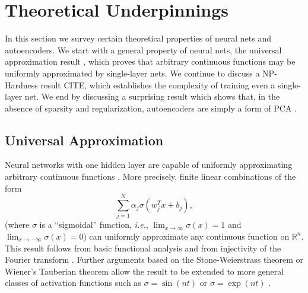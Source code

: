 \documentclass[twocolumn]{article}
\newcommand{\R}{\mathbb{R}}
\begin{document}


\section{Theoretical Underpinnings}
In this section we survey certain theoretical properties of neural nets and
autoencoders. We start with a general property of neural nets, the universal
approximation result \cite{cybenko1989approximation}, which proves that
arbitrary continuous functions may be uniformly approximated by single-layer
nets. We continue to discuss a NP-Hardness result CITE, which establishes the
complexity of training even a single-layer net. We end by discussing a
surprising result which shows that, in the absence of sparsity and
regularization, autoencoders are simply a form of PCA \cite{bourlard1988auto}.

\subsection{Universal Approximation}
Neural networks with one hidden layer are capable of uniformly approximating
arbitrary continuous functions \cite{cybenko1989approximation}. More precisely,
finite linear combinations of the form
\[\sum_{j=1}^N \alpha_j \sigma(w_j^T x + b_j), \]
(where $\sigma$ is a ``sigmoidal'' function, \textit{i.e.}, $\lim_{x \to \infty}
\sigma(x) = 1$ and $\lim_{x \to -\infty} \sigma(x) = 0$) can uniformly
approximate any continuous function on $\R^n$.  This result follows from basic
functional analysis and from injectivity of the Fourier transform
\cite{rudin1991functional}. Further arguments based on the Stone-Weierstrass
theorem or Wiener's Tauberian theorem allow the result to be extended to more
general classes of activation functions such as $\sigma = \sin(nt)$ or $\sigma =
\exp(nt)$ \cite{rudin1991functional}.
\end{document}

